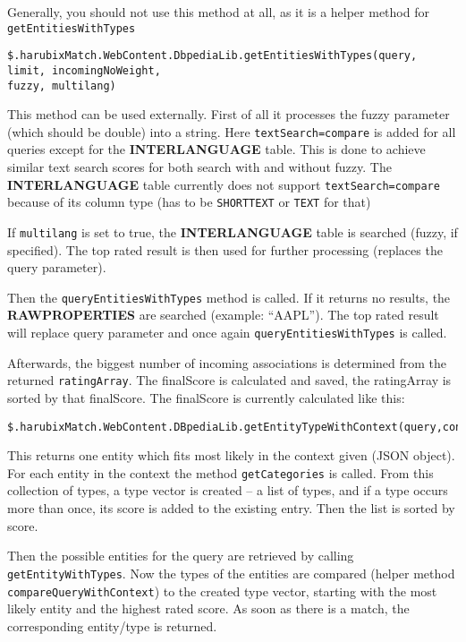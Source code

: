 Generally, you should not use this method at all, as it is a helper method for \texttt{getEntitiesWithTypes}

\scriptsize
\begin{verbatim}
$.harubixMatch.WebContent.DbpediaLib.getEntitiesWithTypes(query, limit, incomingNoWeight,
fuzzy, multilang)
\end{verbatim}
\normalsize

This method can be used externally. First of all it processes the fuzzy parameter (which should be double) into a string. Here \texttt{textSearch=compare} is added for all queries except for the \textbf{INTERLANGUAGE} table. This is done to achieve similar text search scores for both search with and without fuzzy. The \textbf{INTERLANGUAGE} table currently does not support \texttt{textSearch=compare} because of its column type (has to be \texttt{SHORTTEXT} or \texttt{TEXT} for that)

If \texttt{multilang} is set to true, the \textbf{INTERLANGUAGE} table is searched (fuzzy, if specified). The top rated result is then used for further processing (replaces the query parameter).

Then the \texttt{queryEntitiesWithTypes} method is called. If it returns no results, the \textbf{RAWPROPERTIES} are searched (example: “AAPL”). The top rated result will replace query parameter and once again \texttt{queryEntitiesWithTypes} is called.

Afterwards, the biggest number of incoming associations is determined from the returned \texttt{ratingArray}. The finalScore is calculated and saved, the ratingArray is sorted by that finalScore. The finalScore is currently calculated like this:

\scriptsize
\begin{verbatim}
$.harubixMatch.WebContent.DBpediaLib.getEntityTypeWithContext(query,context,limit)
\end{verbatim}
\normalsize

This returns one entity which fits most likely in the context given (JSON object). For each entity in the context the method \texttt{getCategories} is called. From this collection of types, a type vector is created – a list of types, and if a type occurs more than once, its score is added to the existing entry. Then the list is sorted by score.

Then the possible entities for the query are retrieved by calling \texttt{getEntityWithTypes}. Now the types of the entities are compared (helper method \texttt{compareQueryWithContext}) to the created type vector, starting with the most likely entity and the highest rated score. As soon as there is a match, the corresponding entity/type is returned.

